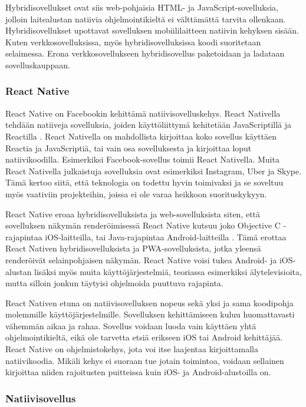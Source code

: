 \documentclass{tktltiki}
\begin{document}
Hybridisovellukset ovat siis web-pohjaisia HTML- ja JavaScript-sovelluksia, jolloin laitealustan natiivia ohjelmointikieltä ei välttämättä tarvita ollenkaan. Hybridisovellukset upottavat sovelluksen mobiililaitteen natiivin kehyksen sisään. Kuten verkkosovelluksissa, myös hybridisovelluksissa koodi suoritetaan selaimessa. Erona verkkosovellukseen hybridisovellus paketoidaan ja ladataan sovelluskauppaan. 

\subsubsection{React Native}

React Native on Facebookin kehittämä natiivisovelluskehys. React Nativella tehdään natiiveja sovelluksia, joiden käyttöliittymä kehitetään JavaScriptillä ja Reactilla \cite{Facebook}. React Nativella on mahdollista kirjoittaa koko sovellus käyttäen Reactia ja JavaScriptiä, tai vain osa sovelluksesta ja kirjoittaa loput natiivikoodilla. Esimerkiksi Facebook-sovellus toimii React Nativella. Muita React Nativella julkaistuja sovelluksia ovat esimerkiksi Instagram, Uber ja Skype. Tämä kertoo siitä, että teknologia on todettu hyvin toimivaksi ja se soveltuu myös vaativiin projekteihin, joissa ei ole varaa heikkoon suorituskykyyn.

React Native eroaa hybridisovelluksista ja web-sovelluksista siten, että sovelluksen näkymän renderöimisessä React Native kutsuu joko Objective C -rajapintaa iOS-laitteilla, tai Java-rajapintaa Android-laitteilla \cite{Aggarwal}. Tämä erottaa React Nativen hybridisovelluksista ja PWA-sovelluksista, jotka yleensä renderöivät selainpohjaisen näkymän. React Native voisi tukea Android- ja iOS-alustan lisäksi myös muita käyttöjärjestelmiä, teoriassa esimerkiksi älytelevisioita, mutta silloin jonkun täytyisi ohjelmoida puuttuva rajapinta.

React Nativen etuna on natiivisovelluksen nopeus sekä yksi ja sama koodipohja molemmille käyttöjärjestelmille. Sovelluksen kehittämiseen kuluu huomattavasti vähemmän aikaa ja rahaa. Sovellus voidaan luoda vain käyttäen yhtä ohjelmointikieltä, eikä ole tarvetta etsiä erikseen iOS tai Android kehittäjää. React Native on ohjelmistokehys, jota voi itse laajentaa kirjoittamalla natiivikoodia. Mikäli kehys ei suoraan tue jotain toimintoa, voidaan sellainen kirjoittaa niiden rajoitusten puitteissa kuin iOS- ja Android-alustoilla on.

\subsubsection{Natiivisovellus}
\end{document}

